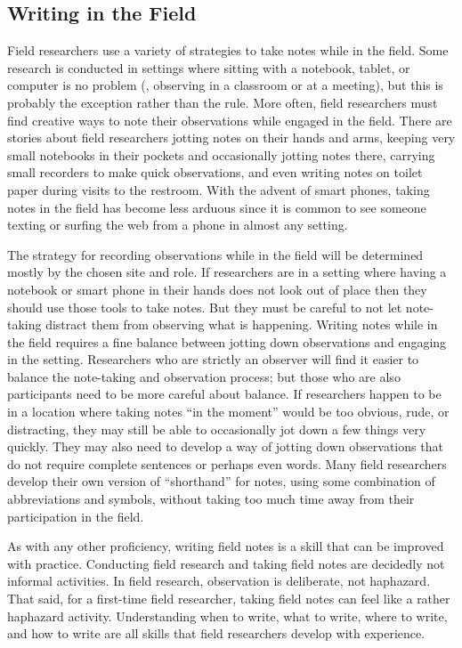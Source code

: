 \subsection{Writing in the Field}

Field researchers use a variety of strategies to take notes while in the field. Some research is conducted in settings where sitting with a notebook, tablet, or computer is no problem (\eg, observing in a classroom or at a meeting), but this is probably the exception rather than the rule. More often, field researchers must find creative ways to note their observations while engaged in the field. There are stories about field researchers jotting notes on their hands and arms, keeping very small notebooks in their pockets and occasionally jotting notes there, carrying small recorders to make quick observations, and even writing notes on toilet paper during visits to the restroom. With the advent of smart phones, taking notes in the field has become less arduous since it is common to see someone texting or surfing the web from a phone in almost any setting.

The strategy for recording observations while in the field will be determined mostly by the chosen site and role. If researchers are in a setting where having a notebook or smart phone in their hands does not look out of place then they should use those tools to take notes. But they must be careful to not let note-taking distract them from observing what is happening. Writing notes while in the field requires a fine balance between jotting down observations and engaging in the setting. Researchers who are strictly an observer will find it easier to balance the note-taking and observation process; but those who are also participants need to be more careful about balance. If researchers happen to be in a location where taking notes ``in the moment'' would be too obvious, rude, or distracting, they may still be able to occasionally jot down a few things very quickly. They may also need to develop a way of jotting down observations that do not require complete sentences or perhaps even words. Many field researchers develop their own version of ``shorthand'' for notes, using some combination of abbreviations and symbols, without taking too much time away from their participation in the field.

As with any other proficiency, writing field notes is a skill that can be improved with practice. Conducting field research and taking field notes are decidedly not informal activities. In field research, observation is deliberate, not haphazard. That said, for a first-time field researcher, taking field notes can feel like a rather haphazard activity. Understanding when to write, what to write, where to write, and how to write are all skills that field researchers develop with experience.

